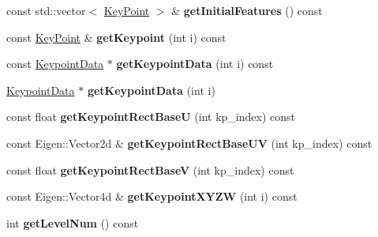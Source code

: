 \begin{DoxyCompactItemize}
\item 
\hypertarget{classfovis_1_1PyramidLevel_a862d98fc6ffbe2d9e9eefa96a5204f82}{
const std::vector$<$ \hyperlink{classfovis_1_1KeyPoint}{KeyPoint} $>$ \& {\bfseries getInitialFeatures} () const }
\label{classfovis_1_1PyramidLevel_a862d98fc6ffbe2d9e9eefa96a5204f82}

\item 
\hypertarget{classfovis_1_1PyramidLevel_ac76712b2fb8617f6b40cfd7b52a4578c}{
const \hyperlink{classfovis_1_1KeyPoint}{KeyPoint} \& {\bfseries getKeypoint} (int i) const }
\label{classfovis_1_1PyramidLevel_ac76712b2fb8617f6b40cfd7b52a4578c}

\item 
\hypertarget{classfovis_1_1PyramidLevel_ae384c7beac17bdc5a66f7e0b09371a4f}{
const \hyperlink{classfovis_1_1KeypointData}{KeypointData} $\ast$ {\bfseries getKeypointData} (int i) const }
\label{classfovis_1_1PyramidLevel_ae384c7beac17bdc5a66f7e0b09371a4f}

\item 
\hypertarget{classfovis_1_1PyramidLevel_a10ac8acd277ef2a168162489fe8dab8b}{
\hyperlink{classfovis_1_1KeypointData}{KeypointData} $\ast$ {\bfseries getKeypointData} (int i)}
\label{classfovis_1_1PyramidLevel_a10ac8acd277ef2a168162489fe8dab8b}

\item 
\hypertarget{classfovis_1_1PyramidLevel_af35b57abfc0059c951e3f9acc0dfb756}{
const float {\bfseries getKeypointRectBaseU} (int kp\_\-index) const }
\label{classfovis_1_1PyramidLevel_af35b57abfc0059c951e3f9acc0dfb756}

\item 
\hypertarget{classfovis_1_1PyramidLevel_a4bd19b62564e3e74453a551539c72397}{
const Eigen::Vector2d \& {\bfseries getKeypointRectBaseUV} (int kp\_\-index) const }
\label{classfovis_1_1PyramidLevel_a4bd19b62564e3e74453a551539c72397}

\item 
\hypertarget{classfovis_1_1PyramidLevel_a7ea0d7902de164ffd9817b0274901c57}{
const float {\bfseries getKeypointRectBaseV} (int kp\_\-index) const }
\label{classfovis_1_1PyramidLevel_a7ea0d7902de164ffd9817b0274901c57}

\item 
\hypertarget{classfovis_1_1PyramidLevel_a954f048408c43362b316cc202142b9f4}{
const Eigen::Vector4d \& {\bfseries getKeypointXYZW} (int i) const }
\label{classfovis_1_1PyramidLevel_a954f048408c43362b316cc202142b9f4}

\item 
\hypertarget{classfovis_1_1PyramidLevel_ad4dc7171634839f3dedc2e90a2d6ef33}{
int {\bfseries getLevelNum} () const }
\label{classfovis_1_1PyramidLevel_ad4dc7171634839f3dedc2e90a2d6ef33}


\end{DoxyCompactItemize}
